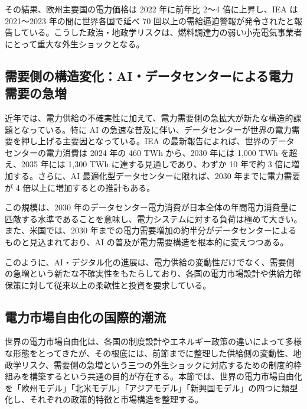 その結果、欧州主要国の電力価格は 2022 年に前年比 2〜4 倍に上昇し、IEA は 2021〜2023 年の間に世界各国で延べ 70 回以上の需給逼迫警報が発令されたと報告している\parencite{IEA2024Electricity}。こうした政治・地政学リスクは、燃料調達力の弱い小売電気事業者にとって重大な外生ショックとなる。

\subsection{需要側の構造変化：AI・データセンターによる電力需要の急増}

近年では、電力供給の不確実性に加えて、電力需要側の急拡大が新たな構造的課題となっている。特に AI の急速な普及に伴い、データセンターが世界の電力需要を押し上げる主要因となっている。IEA の最新報告によれば、世界のデータセンターの電力消費は 2024 年の 460 TWh から、2030 年には 1,000 TWh を超え、2035 年には 1,300 TWh に達する見通しであり、わずか 10 年で約 3 倍に増加する\parencite{IEA2025EnergySupplyAI}。さらに、AI 最適化型データセンターに限れば、2030 年までに電力需要が 4 倍以上に増加するとの推計もある\parencite{IEA2025AISurge}。

この規模は、2030 年のデータセンター電力消費が日本全体の年間電力消費量に匹敵する水準であることを意味し、電力システムに対する負荷は極めて大きい。また、米国では、2030 年までの電力需要増加の約半分がデータセンターによるものと見込まれており、AI の普及が電力需要構造を根本的に変えつつある\parencite{IEA2025AISurge}。

このように、AI・デジタル化の進展は、電力供給の変動性だけでなく、需要側の急増という新たな不確実性をもたらしており、各国の電力市場設計や供給力確保策に対して従来以上の柔軟性と投資を要求している。

\subsection{電力市場自由化の国際的潮流}

世界の電力市場自由化は、各国の制度設計やエネルギー政策の違いによって多様な形態をとってきたが、その根底には、前節までに整理した供給側の変動性、地政学リスク、需要側の急増という三つの外生ショックに対応するための制度的枠組みを構築するという共通の目的が存在する。本節では、世界の電力市場自由化を「欧州モデル」「北米モデル」「アジアモデル」「新興国モデル」の四つに類型化し、それぞれの政策的特徴と市場構造を整理する。

